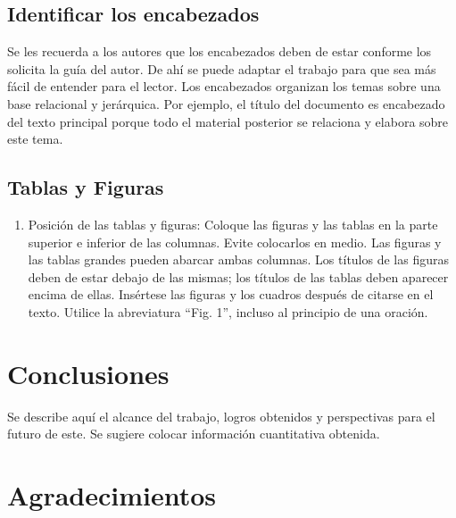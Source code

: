     \subsection{Identificar los encabezados}
    
    Se les recuerda a los autores que los encabezados deben de estar conforme los solicita la guía del autor. De ahí se puede adaptar el trabajo para que sea más fácil de entender para el lector.
    Los encabezados organizan los temas sobre una base relacional y jerárquica. Por ejemplo, el título del documento es encabezado del texto principal porque todo el material posterior se relaciona y elabora sobre este tema. 
    
    \subsection{Tablas y Figuras}
    
    \newpage
    \label{anexo:evidencia1ManualDeEnsambleCircuitoElectrónicoESP32-C6.pdf}
    
    
    \begin{enumerate}
        \item Posición de las tablas y figuras: Coloque las figuras y las tablas en la parte superior e inferior de las columnas. Evite colocarlos en medio. Las figuras y las tablas grandes pueden abarcar ambas columnas. Los títulos de las figuras deben de estar debajo de las mismas; los títulos de las tablas deben aparecer encima de ellas. Insértese las figuras y los cuadros después de citarse en el texto. Utilice la abreviatura “Fig. 1”, incluso al principio de una oración. 
    \end{enumerate}
    
    \section{Conclusiones}
    
    Se describe aquí el alcance del trabajo, logros obtenidos y perspectivas para el futuro de este. Se sugiere colocar información cuantitativa obtenida.
    
    \section{Agradecimientos}
    
